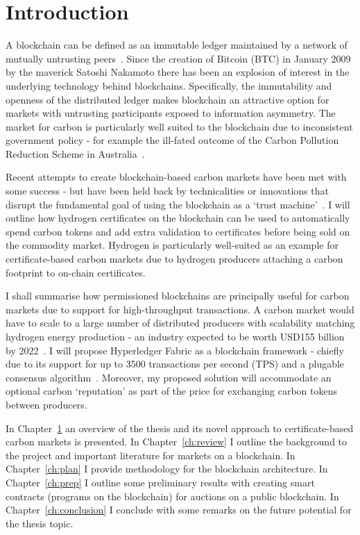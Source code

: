 \chapter{Introduction}\label{ch:intro}
A blockchain can be defined as an immutable ledger maintained by a network of
mutually untrusting peers~\cite{And18}. Since the creation of Bitcoin (BTC) in January 2009
by the maverick Satoshi Nakamoto there has been an explosion of interest in
the underlying technology behind blockchains. Specifically, the
immutability and openness of the distributed ledger makes blockchain an
attractive option for markets with untrusting participants exposed to
information asymmetry. The market for carbon is particularly well suited to
the blockchain due to inconsistent government policy - for example the
ill-fated outcome of the Carbon Pollution Reduction Scheme in
Australia~\cite{Erg13}.

Recent attempts to create blockchain-based carbon markets have been met
with some success - but have been held back by technicalities or innovations
that disrupt the fundamental goal of using the blockchain as a
`trust machine'~\cite{EconT}.
I will outline how hydrogen certificates on the blockchain can be used to
automatically spend carbon tokens and add extra validation to certificates
before being
sold on the commodity market. Hydrogen is particularly well-suited as an
example for certificate-based carbon markets due to hydrogen producers
attaching a carbon footprint to on-chain certificates.

I shall summarise how permissioned blockchains are principally useful for
carbon markets due to support for high-throughput transactions.
A carbon market would have to scale to a large number of distributed
producers with scalability matching hydrogen energy production -
an industry expected to be worth USD155 billion by 2022~\cite{Bru18}.
I will propose
Hyperledger Fabric as a blockchain framework - chiefly due to its support
for up to 3500 transactions per second (TPS) and a plugable consensus
algorithm~\cite{And18}.
Moreover, my proposed solution will accommodate an optional
carbon ‘reputation’ as part of the price for exchanging carbon tokens
between producers.

In Chapter~\ref{ch:intro} an overview of the thesis and its novel
approach to certificate-based carbon markets is presented.
In Chapter~\ref{ch:review} I outline the background to the project and
important literature for markets on a blockchain. In Chapter~\ref{ch:plan}
I provide methodology for the blockchain architecture.
In Chapter~\ref{ch:prep} I outline some preliminary results with
creating smart contracts (programs on the blockchain) for auctions on a
public blockchain. In Chapter~\ref{ch:conclusion} I conclude with some
remarks on the future potential for the thesis topic.


